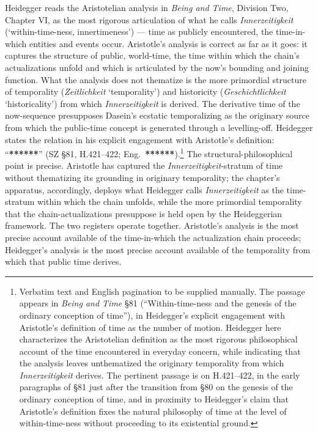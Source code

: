 Heidegger reads the Aristotelian analysis in \textit{Being and Time}, Division Two, Chapter VI, as the most rigorous articulation of what he calls \textit{Innerzeitigkeit} (`within-time-ness, innertimeness') --- time as publicly encountered, the time-in-which entities and events occur. Aristotle's analysis is correct as far as it goes: it captures the structure of public, world-time, the time within which the chain's actualizations unfold and which is articulated by the now's bounding and joining function. What the analysis does not thematize is the more primordial structure of temporality (\textit{Zeitlichkeit} `temporality') and historicity (\textit{Geschichtlichkeit} `historicality') from which \textit{Innerzeitigkeit} is derived. The derivative time of the now-sequence presupposes Dasein's ecstatic temporalizing as the originary source from which the public-time concept is generated through a levelling-off. Heidegger states the relation in his explicit engagement with Aristotle's definition: ``\textbf{******}'' (SZ \S 81, H.421--422; Eng.~\textbf{******}).\footnote{Verbatim text and English pagination to be supplied manually. The passage appears in \textit{Being and Time} \S 81 (``Within-time-ness and the genesis of the ordinary conception of time''), in Heidegger's explicit engagement with Aristotle's definition of time as the number of motion. Heidegger here characterizes the Aristotelian definition as the most rigorous philosophical account of the time encountered in everyday concern, while indicating that the analysis leaves unthematized the originary temporality from which \textit{Innerzeitigkeit} derives. The pertinent passage is on H.421--422, in the early paragraphs of \S 81 just after the transition from \S 80 on the genesis of the ordinary conception of time, and in proximity to Heidegger's claim that Aristotle's definition fixes the natural philosophy of time at the level of within-time-ness without proceeding to its existential ground.} The structural-philosophical point is precise. Aristotle has captured the \textit{Innerzeitigkeit}-stratum of time without thematizing its grounding in originary temporality; the chapter's apparatus, accordingly, deploys what Heidegger calls \textit{Innerzeitigkeit} as the time-stratum within which the chain unfolds, while the more primordial temporality that the chain-actualizations presuppose is held open by the Heideggerian framework. The two registers operate together. Aristotle's analysis is the most precise account available of the time-in-which the actualization chain proceeds; Heidegger's analysis is the most precise account available of the temporality from which that public time derives.

